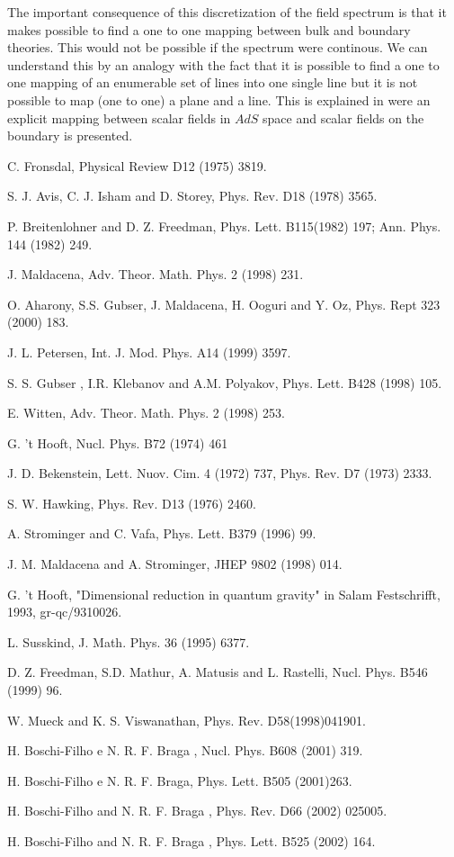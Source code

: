 \documentclass[a4paper,twocolumn,prd,groupedaddress,nofootinbib]{revtex4}
\begin{document}
\bigskip

\noindent The important consequence of this discretization of the field spectrum is 
that it makes possible to
find a one to one mapping between bulk and boundary theories.
This would not be possible if the spectrum were continous.
We can understand this by an analogy with the fact that it is possible to find 
a one to one mapping of an enumerable set of lines 
into one single line but it is not possible to map (one to one) a plane and a line.
This is explained in \cite{BB4} were an explicit mapping between scalar fields 
in $AdS$ space and scalar fields on the boundary is presented.
   
\vspace{1cm}
\begin{thebibliography}{100}
 C. Fronsdal, Physical Review D12 (1975) 3819.

 S. J. Avis, C. J. Isham and D. Storey, Phys. Rev. D18
(1978) 3565.

 P. Breitenlohner and D. Z. Freedman, 
Phys. Lett. B115(1982) 197; Ann. Phys. 144 (1982) 249.

 J. Maldacena, Adv. Theor. Math. Phys. 2 (1998) 231.


 O. Aharony, S.S. Gubser, J. Maldacena, 
H. Ooguri and Y. Oz, Phys. Rept 323 (2000) 183.

 J. L. Petersen, Int. J. Mod. Phys. A14 (1999) 3597.

 S. S. Gubser , I.R. Klebanov and A.M. Polyakov, 
Phys. Lett. B428 (1998) 105.

 E. Witten, Adv. Theor. Math. Phys. 2 (1998) 253.

 G. 't Hooft,  Nucl. Phys. B72 (1974) 461 

 J. D. Bekenstein, Lett. Nuov. Cim. 4 (1972) 737, 
Phys. Rev. D7 (1973) 2333.

 S. W. Hawking, Phys. Rev. D13 (1976) 2460.

 A. Strominger and C. Vafa, Phys. Lett. B379 (1996) 99.

 J. M. Maldacena and  A. Strominger,  JHEP 9802 (1998) 014.

 G. 't Hooft, "Dimensional reduction in quantum gravity"
in Salam Festschrifft, 1993, gr-qc/9310026.

 L. Susskind, J. Math. Phys. 36 (1995) 6377.
 
 D. Z. Freedman, S.D. Mathur, A. Matusis and L. Rastelli,
Nucl. Phys. B546 (1999) 96.
 
 W. Mueck and K. S. Viswanathan, Phys. Rev. D58(1998)041901.

 H. Boschi-Filho e N. R. F. Braga , Nucl. Phys.  B608 (2001) 
319.

  H. Boschi-Filho e N. R. F. Braga, Phys. Lett. B505
 (2001)263.

 H. Boschi-Filho and N. R. F. Braga , Phys. Rev. D66 (2002) 025005.

 H. Boschi-Filho and N. R. F. Braga , Phys. Lett. B525 (2002) 164.


\end{thebibliography}
\end{document}
